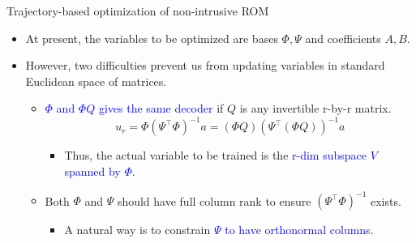 \documentclass[presentation]{beamer}
\begin{document}
\begin{frame}[label={sec:org7b7723c}]{Trajectory-based optimization of non-intrusive ROM}
\begin{itemize}[<+->]
\item At present, the variables to be optimized are bases \(\Phi, \Psi\) and coefficients \(A, B\).
\item However, two difficulties prevent us from updating variables in standard Euclidean space of matrices.
\begin{itemize}
\item \textcolor{blue}{$\Phi$ and $\Phi Q$ gives the same decoder} if \(Q\) is any invertible r-by-r matrix.
\begin{equation}
  \label{eq:4}
  u_{r} = \Phi(\Psi^{\top}\Phi)^{-1}a = (\Phi Q)(\Psi^{\top}(\Phi Q))^{-1}a 
\end{equation}
\begin{itemize}
\item Thus, the actual variable to be trained is the \textcolor{blue}{r-dim subspace $V$ spanned by $\Phi$}.
\end{itemize}
\item Both \(\Phi\) and \(\Psi\) should have full column rank to ensure \((\Psi^{\top}\Phi)^{-1}\) exists.
\begin{itemize}
\item A natural way is to constrain \textcolor{blue}{$\Psi$ to have orthonormal columns.}
\end{itemize}
\end{itemize}
\end{itemize}
\end{frame}
\end{document}
